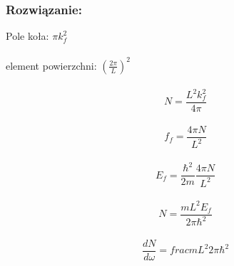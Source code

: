 \subsubsection*{Rozwiązanie:}
Pole koła: $\pi k_f^2$
\\
\\
element powierzchni: $(\frac{2\pi}{L})^2$
\\
\\
\begin{equation}
N=\frac{L^2k_f^2}{4\pi}
\end{equation}
\\
\begin{equation}
f_f=\frac{4\pi N}{L^2} 
\end{equation}
\\
\begin{equation}
E_f=\frac{\hbar^2}{2m}\frac{4\pi N}{L^2}
\end{equation}
\\
\begin{equation}
N=\frac{mL^2E_f}{2\pi \hbar^2}
\end{equation}
\\
\begin{equation}
\frac{dN}{d\omega}=frac{mL^2}{2\pi \hbar^2}
\end{equation}
\hrulefill
